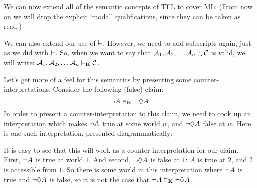 We can now extend all of the semantic concepts of TFL to cover ML:
(From now on we will drop the explicit `modal' qualifications, since they can be taken as read.)

We can also extend our use of $\vDash$. However, we need to add subscripts again, just as we did with $\vdash$. So, when we want to say that $\metav{A}_1,\metav{A}_2, \dots \metav{A}_n\therefore\metav{C}$ is valid, we will write: $\mathcal{A}_1,\mathcal{A}_2, \dots \mathcal{A}_n\vDash_{\mathbf{K}}\mathcal{C}$.

Let's get more of a feel for this semantics by presenting some counter-interpretations. Consider the following (false) claim:
\[\neg A\vDash_{\mathbf{K}} \neg \Diamond A\]
In order to present a counter-interpretation to this claim, we need to cook up an interpretation which makes $\neg A$ true at some world $w$, and $\neg\Diamond A$ false at $w$. Here is one such interpretation, presented diagrammatically:
\begin{center}
\begin{bmlimage}
\end{bmlimage}
\end{center}
It is easy to see that this will work as a counter-interpretation for our claim. First, $\neg A$ is true at world $1$. And second, $\neg\Diamond A$ is false at $1$: $A$ is true at $2$, and $2$ is accessible from $1$. So there is some world in this interpretation where $\neg A$ is true and $\neg\Diamond A$ is false, so it is not the case that $\neg A\vDash_{\mathbf{K}}\neg\Diamond A$.

